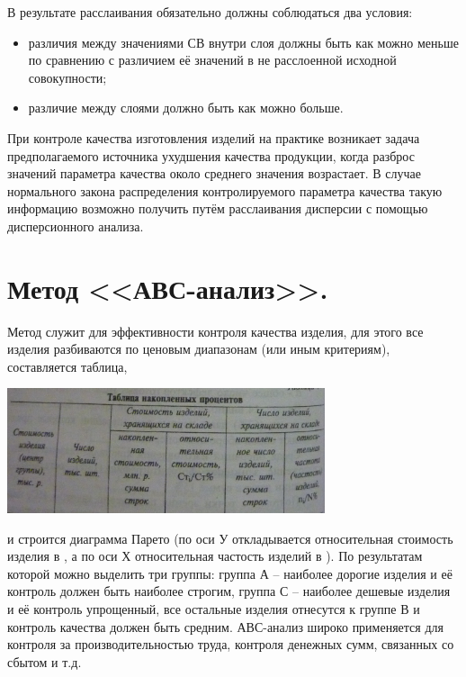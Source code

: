 \documentclass[unicode, 12pt, a4paper, oneside]{article}
\begin{document}
В результате расслаивания обязательно должны соблюдаться два условия:
\begin{itemize}
\item различия между значениями СВ внутри слоя должны быть как можно меньше по сравнению с различием её значений в не расслоенной исходной совокупности;
\item различие между слоями  должно быть как можно больше.
\end{itemize}	

При контроле качества изготовления изделий на практике возникает задача предполагаемого источника ухудшения качества продукции, когда разброс значений параметра качества около среднего значения возрастает. В случае нормального закона распределения контролируемого параметра качества такую информацию возможно получить путём расслаивания дисперсии с помощью дисперсионного анализа.

\section{Метод <<АВС-анализ>>.}

Метод служит для эффективности контроля качества изделия, для этого все изделия разбиваются по ценовым диапазонам (или иным критериям), составляется таблица,\\
\begin{center} 
  \includegraphics[width=0.7\textwidth]{36_Shapka.png}
  \end{center}
   и строится диаграмма Парето (по оси У откладывается относительная стоимость изделия в 
   \textdiscount
   , а по оси Х относительная частость изделий в
  \textdiscount). По результатам которой можно выделить три группы: группа А – наиболее дорогие изделия и её контроль должен быть наиболее строгим, группа С – наиболее дешевые изделия и её контроль упрощенный, все остальные изделия отнесутся к группе В и контроль качества должен быть средним.
  АВС-анализ широко применяется для контроля за производительностью труда, контроля денежных сумм, связанных со сбытом  и т.д.
  
\end{document}
